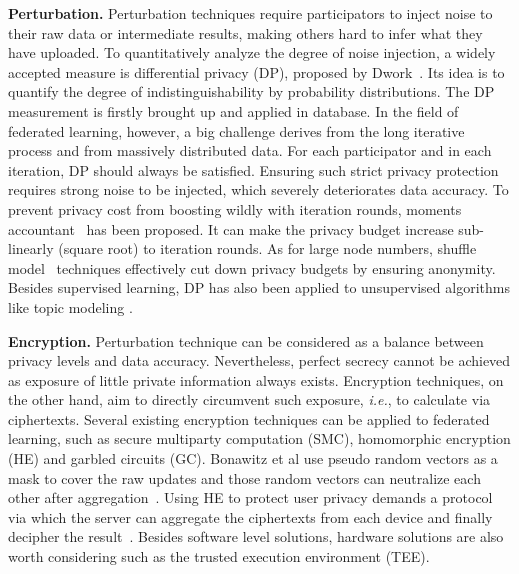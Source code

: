 \documentclass[11pt]{article}
\newcommand{\ie}{\textit{i.e.}\xspace}
\newcommand{\fakeparagraph}[1]{\vspace{1mm}\noindent\textbf{#1.}}
\begin{document}
\fakeparagraph{Perturbation}
Perturbation techniques require participators to inject noise to their raw data or intermediate results, making others hard to infer what they have uploaded.
To quantitatively analyze the degree of noise injection, a widely accepted measure is differential privacy (DP), proposed by Dwork~\cite{DBLP:conf/icalp/Dwork06}.
Its idea is to quantify the degree of indistinguishability by probability distributions.
The DP measurement is firstly brought up and applied in database. In the field of federated learning, however, a big challenge derives from the long iterative process and from massively distributed data. 
For each participator and in each iteration, DP should always be satisfied.
Ensuring such strict privacy protection requires strong noise to be injected, which severely deteriorates data accuracy.
To prevent privacy cost from boosting wildly with iteration rounds, moments accountant~\cite{DBLP:conf/ccs/AbadiCGMMT016} has been proposed. 
It can make the privacy budget increase sub-linearly (square root) to iteration rounds. 
As for large node numbers, shuffle model~\cite{DBLP:conf/soda/ErlingssonFMRTT19} techniques effectively cut down privacy budgets by ensuring anonymity.
Besides supervised learning, DP has also been applied to unsupervised algorithms like topic modeling \cite{DBLP:conf/cikm/JiangSTWZXY19, DBLP:conf/aaai/WangTS20}.

\fakeparagraph{Encryption}
Perturbation technique can be considered as a balance between privacy levels and data accuracy. Nevertheless, perfect secrecy cannot be achieved as exposure of little private information always exists. 
Encryption techniques, on the other hand, aim to directly circumvent such exposure, \ie, to calculate via ciphertexts. Several existing encryption techniques can be applied to federated learning, such as secure multiparty computation (SMC), homomorphic encryption (HE) and garbled circuits (GC).
Bonawitz et al use pseudo random vectors as a mask to cover the raw updates and those random vectors can neutralize each other after aggregation~\cite{DBLP:conf/ccs/BonawitzIKMMPRS17}.
Using HE to protect user privacy demands a protocol via which the server can aggregate the ciphertexts from each device and finally decipher the result~\cite{DBLP:journals/tifs/ErkinVTL12}.
Besides software level solutions, hardware solutions are also worth considering such as the trusted execution environment (TEE).
\end{document}
